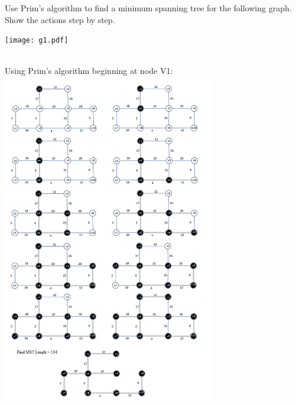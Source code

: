 \documentclass[addpoints,11pt]{exam}
\begin{document}
	
	\begin{questions}
		\question[10]
		Use Prim's algorithm to find a minimum spanning tree for the following graph.  Show the actions step by step.
		
		\texttt{[image: g1.pdf]}
		\begin{solutionorbox} \\ 
			Using Prim's algorithm beginning at node V1: \\
			\includegraphics[width=0.7\textwidth]{prims.jpg}
		\end{solutionorbox}
		
		\ifprintanswers
		\newpage
		\else
		\bigskip
		\fi
		

\end{questions}
\end{document}
